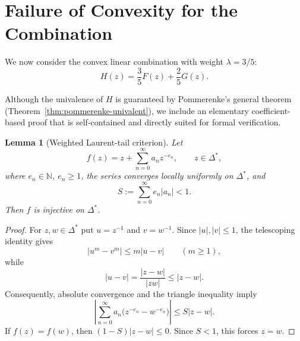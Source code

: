 \documentclass[11pt,reqno]{amsart}
\newtheorem{lemma}[theorem]{Lemma}
\theoremstyle{definition}
\begin{document}
\section{Failure of Convexity for the Combination}

We now consider the convex linear combination with weight $\lambda = 3/5$:
\begin{equation}
H(z) = \frac{3}{5} F(z) + \frac{2}{5} G(z).
\end{equation}

Although the univalence of $H$ is guaranteed by Pommerenke's general theorem (Theorem~\ref{thm:pommerenke-univalent}), we include an elementary coefficient-based proof that is self-contained and directly suited for formal verification.

\begin{lemma}[Weighted Laurent-tail criterion]\label{lem:laurent-tail}
Let
\begin{equation}
f(z)=z+\sum_{n=0}^{\infty}a_n z^{-e_n}, \qquad z\in\Delta^*,
\end{equation}
where $e_n\in\mathbb{N}$, $e_n\geq 1$, the series converges locally uniformly on $\Delta^*$, and
\begin{equation}\label{eq:tail-bound}
S:=\sum_{n=0}^{\infty}e_n|a_n|<1.
\end{equation}
Then $f$ is injective on $\Delta^*$.
\end{lemma}
\begin{proof}
For $z,w\in\Delta^*$ put $u=z^{-1}$ and $v=w^{-1}$. Since $|u|,|v|\leq 1$, the telescoping identity gives
\[
|u^m-v^m|\leq m|u-v| \qquad(m\geq 1),
\]
while
\[
|u-v|=\frac{|z-w|}{|zw|}\leq |z-w|.
\]
Consequently, absolute convergence and the triangle inequality imply
\[
\left|\sum_{n=0}^{\infty}a_n\bigl(z^{-e_n}-w^{-e_n}\bigr)\right|
\leq S|z-w|.
\]
If $f(z)=f(w)$, then $(1-S)|z-w|\leq 0$. Since $S<1$, this forces $z=w$.
\end{proof}
\end{document}
